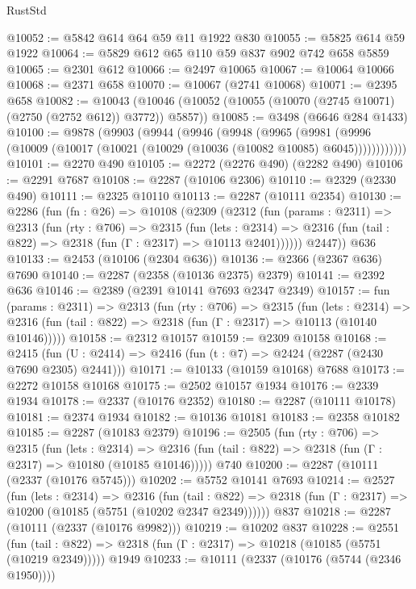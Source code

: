 \begin{lexlean}{RustStd}
\begin{coremodule}
@10052 := @5842 @614 @64 @59 @11 @1922 @830
@10055 := @5825 @614 @59 @1922
@10064 := @5829 @612 @65 @110 @59 @837 @902 @742 @658 @5859
@10065 := @2301 @612
@10066 := @2497 @10065
@10067 := @10064 @10066
@10068 := @2371 @658
@10070 := @10067 (@2741 @10068)
@10071 := @2395 @658
@10082 := @10043 (@10046 (@10052 (@10055 (@10070 (@2745 @10071) (@2750 (@2752 @612)) @3772)) @5857))
@10085 := @3498 (@6646 @284 @1433)
@10100 := @9878
    (@9903
      (@9944
        (@9946
          (@9948
            (@9965
              (@9981
                (@9996 (@10009 (@10017 (@10021 (@10029 (@10036 (@10082 @10085) @6045))))))))))))
@10101 := @2270 @490
@10105 := @2272 (@2276 @490) (@2282 @490)
@10106 := @2291 @7687
@10108 := @2287 (@10106 @2306)
@10110 := @2329 (@2330 @490)
@10111 := @2325 @10110
@10113 := @2287 (@10111 @2354)
@10130 := @2286
    (fun (fn : @26) =>
    @10108
      (@2309
        (@2312
          (fun (params : @2311) =>
          @2313
            (fun (rty : @706) =>
            @2315
              (fun (lets : @2314) =>
              @2316 (fun (tail : @822) => @2318 (fun (Γ : @2317) => @10113 @2401))))))
        @2447))
    @636
@10133 := @2453 (@10106 (@2304 @636))
@10136 := @2366 (@2367 @636) @7690
@10140 := @2287 (@2358 (@10136 @2375) @2379)
@10141 := @2392 @636
@10146 := @2389 (@2391 @10141 @7693 @2347 @2349)
@10157 := fun (params : @2311) =>
  @2313
    (fun (rty : @706) =>
    @2315
      (fun (lets : @2314) =>
      @2316 (fun (tail : @822) => @2318 (fun (Γ : @2317) => @10113 (@10140 @10146)))))
@10158 := @2312 @10157
@10159 := @2309 @10158
@10168 := @2415 (fun (U : @2414) => @2416 (fun (t : @7) => @2424 (@2287 (@2430 @7690 @2305) @2441)))
@10171 := @10133 (@10159 @10168) @7688
@10173 := @2272 @10158 @10168
@10175 := @2502 @10157 @1934
@10176 := @2339 @1934
@10178 := @2337 (@10176 @2352)
@10180 := @2287 (@10111 @10178)
@10181 := @2374 @1934
@10182 := @10136 @10181
@10183 := @2358 @10182
@10185 := @2287 (@10183 @2379)
@10196 := @2505
    (fun (rty : @706) =>
    @2315
      (fun (lets : @2314) =>
      @2316 (fun (tail : @822) => @2318 (fun (Γ : @2317) => @10180 (@10185 @10146)))))
    @740
@10200 := @2287 (@10111 (@2337 (@10176 @5745)))
@10202 := @5752 @10141 @7693
@10214 := @2527
    (fun (lets : @2314) =>
    @2316
      (fun (tail : @822) =>
      @2318 (fun (Γ : @2317) => @10200 (@10185 (@5751 (@10202 @2347 @2349))))))
    @837
@10218 := @2287 (@10111 (@2337 (@10176 @9982)))
@10219 := @10202 @837
@10228 := @2551
    (fun (tail : @822) => @2318 (fun (Γ : @2317) => @10218 (@10185 (@5751 (@10219 @2349)))))
    @1949
@10233 := @10111 (@2337 (@10176 (@5744 (@2346 @1950))))

\end{coremodule}
\end{lexlean}
